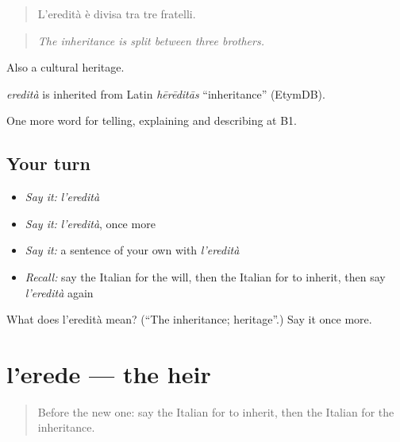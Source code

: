 \begin{quote}
L'eredità è divisa tra tre fratelli.
\end{quote}

\begin{quote}
\emph{The inheritance is split between three brothers.}
\end{quote}

Also a cultural heritage.

\begin{cousinweb}
\emph{eredità} is inherited from Latin \emph{hērēditās} \textquotedblleft{}inheritance\textquotedblright{} (EtymDB).
\end{cousinweb}

\begin{grammarlens}[title={What you've built}]
One more word for telling, explaining and describing at B1.
\end{grammarlens}

\subsection*{Your turn}
\begin{itemize}
\raggedright
  \item \emph{Say it:} \emph{l'eredità}
  \item \emph{Say it:} \emph{l'eredità}, once more
  \item \emph{Say it:} a sentence of your own with \emph{l'eredità}
  \item \emph{Recall:} say the Italian for the will, then the Italian for to inherit, then say \emph{l'eredità} again
\end{itemize}

\begin{tcolorbox}[breakable,colback=teal!4,colframe=teal!35!black,title={Before you move on}]
What does l'eredità mean? (\textquotedblleft{}The inheritance; heritage\textquotedblright{}.) Say it once more.
\end{tcolorbox}
\section[l'erede]{l'erede — the heir}

\label{lesson:IT-C314-erede}



\begin{quote}
Before the new one: say the Italian for to inherit, then the Italian for the inheritance.
\end{quote}

